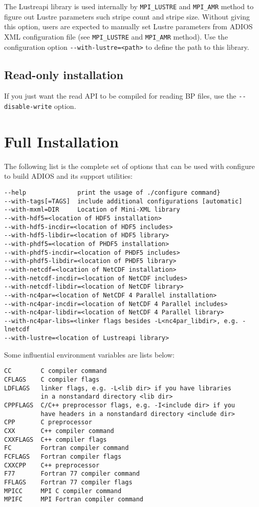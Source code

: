 The Lustreapi library is used internally by \verb+MPI_LUSTRE+ and \verb+MPI_AMR+ method to 
figure out Lustre parameters such stripe count and stripe size.  Without giving 
this option, users are expected to manually set Lustre parameters from ADIOS XML 
configuration file (see \verb+MPI_LUSTRE+ and \verb+MPI_AMR+ method). Use the configuration option
\verb+--with-lustre=<path>+ to define the path to this library.

\subsection{Read-only installation}

If you just want the read API to be compiled for reading BP files, use the \verb+--disable-write+ option.

\section{Full Installation}

The following list is the complete set of options that can be used with 
configure to build ADIOS and its support utilities:

\begin{lstlisting}
--help              print the usage of ./configure command}
--with-tags[=TAGS]  include additional configurations [automatic]
--with-mxml=DIR     Location of Mini-XML library
--with-hdf5=<location of HDF5 installation>
--with-hdf5-incdir=<location of HDF5 includes>
--with-hdf5-libdir=<location of HDF5 library>
--with-phdf5=<location of PHDF5 installation>
--with-phdf5-incdir=<location of PHDF5 includes>
--with-phdf5-libdir=<location of PHDF5 library>
--with-netcdf=<location of NetCDF installation>
--with-netcdf-incdir=<location of NetCDF includes>
--with-netcdf-libdir=<location of NetCDF library>
--with-nc4par=<location of NetCDF 4 Parallel installation>
--with-nc4par-incdir=<location of NetCDF 4 Parallel includes>
--with-nc4par-libdir=<location of NetCDF 4 Parallel library>
--with-nc4par-libs=<linker flags besides -L<nc4par_libdir>, e.g. -lnetcdf
--with-lustre=<location of Lustreapi library>
\end{lstlisting}

Some influential environment variables are lists below:

\begin{lstlisting}
CC        C compiler command
CFLAGS    C compiler flags
LDFLAGS   linker flags, e.g. -L<lib dir> if you have libraries 
          in a nonstandard directory <lib dir>
CPPFLAGS  C/C++ preprocessor flags, e.g. -I<include dir> if you
          have headers in a nonstandard directory <include dir>
CPP       C preprocessor
CXX       C++ compiler command
CXXFLAGS  C++ compiler flags
FC        Fortran compiler command
FCFLAGS   Fortran compiler flags
CXXCPP    C++ preprocessor
F77       Fortran 77 compiler command
FFLAGS    Fortran 77 compiler flags
MPICC     MPI C compiler command
MPIFC     MPI Fortran compiler command
\end{lstlisting}


